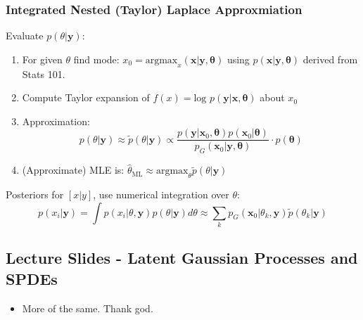 \documentclass{article}
\begin{document}
\subsubsection*{Integrated Nested (Taylor) Laplace Approxmiation}
Evaluate $p(\theta|\pmb{y})$:
\begin{enumerate}
\item For given $\theta$ find mode: $x_{0} = \text{argmax}_{x}(\pmb{x} | \pmb{y}, \pmb{\theta})$ using $p(\pmb{x} | \pmb{y}, \pmb{\theta})$ derived from Stats 101.
\item Compute Taylor expansion of $f(x) = \text{log } p(\pmb{y} | \pmb{x}, \pmb{\theta})$ about $x_{0}$
\item Approximation:
$$ p(\theta|\pmb{y}) \approx \tilde{p}(\theta|\pmb{y}) \propto  \frac{p(\pmb{y} | \pmb{x}_{0}, \pmb{\theta}) p(\pmb{x}_{0} | \pmb{\theta})}{p_{G}(\pmb{x}_{0} | \pmb{y}, \pmb{\theta})} \cdot p(\pmb{\theta})$$
\item (Approximate) MLE is: $\hat{\theta}_{\text{ML}} \approx \text{argmax}_{\theta} \tilde{p}(\theta|\pmb{y})$
\end{enumerate}
Posteriors for $[x | y]$, use numerical integration over $\theta$:
$$ p(x_{i}|\pmb{y}) = \int p(x_{i}|\theta, \pmb{y})p(\theta|\pmb{y})d\theta \approx \sum_{k} p_{G}(\pmb{x}_{0} | \theta_{k}, \pmb{y}) \tilde{p}(\theta_{k}|\pmb{y})$$



\subsection*{Lecture Slides - Latent Gaussian Processes and SPDEs}
\citep{Lindstrom2016}
\begin{itemize}
\item More of the same. Thank god.
\end{itemize}
\end{document}
